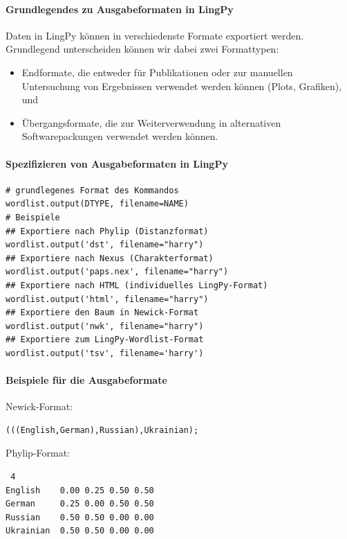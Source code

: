 \paragraph{Grundlegendes zu Ausgabeformaten in LingPy}

Daten in LingPy können in verschiedenste Formate exportiert werden.
Grundlegend unterscheiden können wir dabei zwei Formattypen:

\begin{itemize}
\itemsep1pt\parskip0pt
\item
  Endformate, die entweder für Publikationen oder zur manuellen
  Untersuchung von Ergebnissen verwendet werden können (Plots,
  Grafiken), und
\item
  Übergangsformate, die zur Weiterverwendung in alternativen
  Softwarepackungen verwendet werden können.
\end{itemize}




\paragraph{Spezifizieren von Ausgabeformaten in LingPy}

\begin{verbatim}
# grundlegenes Format des Kommandos
wordlist.output(DTYPE, filename=NAME)
# Beispiele
## Exportiere nach Phylip (Distanzformat)
wordlist.output('dst', filename="harry")
## Exportiere nach Nexus (Charakterformat)
wordlist.output('paps.nex', filename="harry")
## Exportiere nach HTML (individuelles LingPy-Format)
wordlist.output('html', filename="harry")
## Exportiere den Baum in Newick-Format
wordlist.output('nwk', filename="harry")
## Exportiere zum LingPy-Wordlist-Format
wordlist.output('tsv', filename='harry')
\end{verbatim}




\paragraph{Beispiele für die Ausgabeformate}

Newick-Format:

\begin{verbatim}
(((English,German),Russian),Ukrainian);
\end{verbatim}

Phylip-Format:

\begin{verbatim}
 4
English    0.00 0.25 0.50 0.50
German     0.25 0.00 0.50 0.50
Russian    0.50 0.50 0.00 0.00
Ukrainian  0.50 0.50 0.00 0.00
\end{verbatim}





